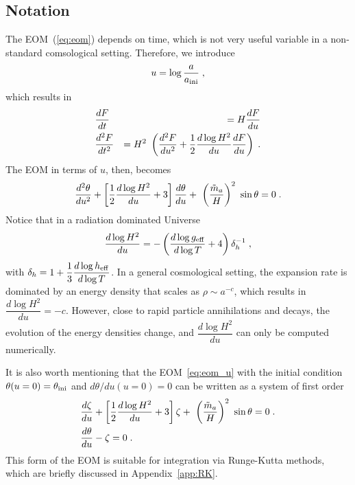 \documentclass[11pt,a4paper]{article}
\begin{document}
\subsection{Notation}\label{sec:notation}
%
%
The EOM~(\ref{eq:eom}) depends on time, which is not very useful variable in a non-standard comsological setting. Therefore, we introduce 
%
\begin{eqnarray}
	u = \log \dfrac{a}{a_{\rm ini}{}} \;,
	\label{eq:natation}
\end{eqnarray}
%
which results in 
%
\begin{eqnarray}
	&\dfrac{d F}{dt} &=  H  \dfrac{d F}{du} 
	\nonumber \\
	&\dfrac{d^2 F}{dt^2} &= H^2 \ \left(  \dfrac{d^2 F}{du^2} + \dfrac{1}{2} \dfrac{d \log H^2}{du}  \dfrac{d F}{du}  \right)\;.
	\label{eq:deriv_u}
\end{eqnarray}
%
The EOM in terms of $u$, then, becomes
%
\begin{equation}
	\dfrac{d^2  \theta}{du^2} + \left[ \dfrac{1}{2} \dfrac{d \log H^2}{du} + 3  \right] \dfrac{d  \theta}{d u} + \ \left( \dfrac{\tilde m_{a}{}}{H} \right)^2 \ \sin \theta
	=0 \;.
	\label{eq:eom_u}
\end{equation}
%
Notice that in a radiation dominated Universe
%
$$
\dfrac{d \log H^2}{du} = -\left(  \dfrac{d \log g_{\rm eff}{}}{d \log T} +4  \right) \delta_h^{-1}\;,
$$
with  $ \delta_h = 1+ \dfrac{1}{3} \dfrac{d \log h_{\rm eff}{}}{d \log T} $. 
%
In a general cosmological setting, the expansion rate is dominated by an energy density that scales as $\rho \sim a^{-c}$, which results in $\dfrac{d \log H^2}{du}  = -c$. However, close to rapid particle annihilations and decays, the evolution of the energy densities change, and $\dfrac{d \log H^2}{du}$ can only be computed numerically.

It is also worth mentioning that the EOM~\ref{eq:eom_u} with the initial condition $\theta(u=0)=\theta_{\rm ini}{}$ and $d\theta/du (u=0)=0$ can be written as a system of first order 
%
\begin{eqnarray}
& \dfrac{d  \zeta}{du} + \left[ \dfrac{1}{2} \dfrac{d \log H^2}{du} + 3  \right] \zeta + \ \left( \dfrac{\tilde m_{a}{}}{H} \right)^2 \ \sin \theta
=0 \;. \\ \nonumber
&\dfrac{d \theta}{d u} - \zeta=0 \;.
\label{eq:eom_sys}
\end{eqnarray}
%
This form of the EOM is suitable for integration via Runge-Kutta methods, which are briefly discussed in Appendix~\ref{app:RK}.
\end{document}
